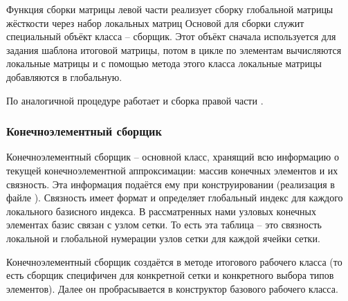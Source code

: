 Функция сборки матрицы левой части реализует сборку глобальной матрицы жёсткости
через набор локальных матриц
Основой для сборки служит специальный объёкт  класса
 -- сборщик.
Этот объёкт сначала используется для задания шаблона итоговой матрицы,
потом в цикле по элементам вычисляются локальные матрицы и с
помощью метода этого класса 
локальные матрицы добавляются в глобальную.

По аналогичной процедуре работает и сборка правой части .

\subsubsection{Конечноэлементный сборщик}
Конечноэлементный сборщик  -- основной класс, хранящий
всю информацию о текущей конечноэлементной аппроксимации: 
массив конечных элементов и их связность.
Эта информация подаётся ему при конструировании (реализация в файле ).
Связность  имеет формат  и
определяет глобальный индекс для каждого локального базисного индекса.
В рассматренных нами узловых конечных элементах базис связан с узлом сетки.
То есть эта таблица -- это связность локальной и глобальной нумерации узлов сетки для каждой ячейки сетки.

Конечноэлементный сборщик создаётся в методе
 итогового
рабочего класса (то есть сборщик специфичен для конкретной сетки
и конкретного выбора типов элементов). Далее он пробрасывается в конструктор базового рабочего класса.

